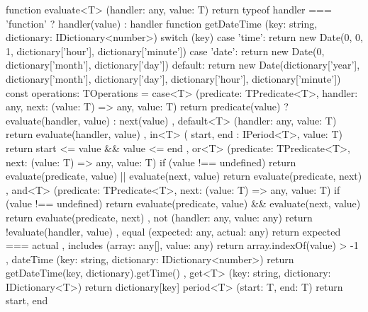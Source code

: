  \hypertarget{app:C}{\label{app:C}}


\begin{code}[frame=single]
function evaluate<T> (handler: any, value: T) {
  return typeof handler === 'function' ? handler(value) :
handler
}  
function getDateTime (key: string, dictionary:
IDictionary<number>) {
  switch (key) {
    case 'time':
      return new Date(0, 0, 1, dictionary['hour'],
dictionary['minute'])
    case 'date':
      return new Date(0, dictionary['month'],
dictionary['day'])
    default:
      return new Date(dictionary['year'], dictionary['month'],
dictionary['day'], dictionary['hour'], dictionary['minute'])
  }
}  
const operations: TOperations = {
  case<T> (predicate: TPredicate<T>, handler: any, next:
(value: T) => any, value: T) {
    return predicate(value) ? evaluate(handler, value) :
next(value)
  },
  default<T> (handler: any, value: T) {
    return evaluate(handler, value)
  },
  in<T> ({ start, end }: IPeriod<T>, value: T) {
    return start <= value && value <= end
  },
  or<T> (predicate: TPredicate<T>, next: (value: T) => any,
value: T) {
    if (value !== undefined) {
      return evaluate(predicate, value) || evaluate(next,
value)
    }
    return evaluate(predicate, next)
  },
  and<T> (predicate: TPredicate<T>, next: (value: T) => any,
value: T) {
    if (value !== undefined) {
      return evaluate(predicate, value) && evaluate(next,
value)
    }
    return evaluate(predicate, next)
  },
  not (handler: any, value: any) {
    return !evaluate(handler, value)
  },
  equal (expected: any, actual: any) {
    return expected === actual
  },
  includes (array: any[], value: any) {
    return array.indexOf(value) > -1
  },
  dateTime (key: string, dictionary: IDictionary<number>) {
    return getDateTime(key, dictionary).getTime()
  },
  get<T> (key: string, dictionary: IDictionary<T>) { return
dictionary[key] }
  period<T> (start: T, end: T) { return { start, end } }
}
\end{code}

\clearpage